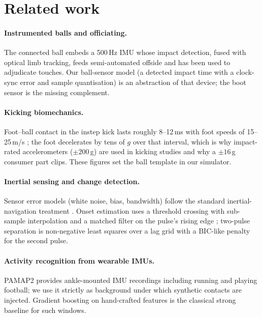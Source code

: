 \section{Related work}
\label{sec:related}

\paragraph{Instrumented balls and officiating.} The connected ball
\cite{fifa2022connected} embeds a 500\,Hz IMU whose impact detection, fused
with optical limb tracking, feeds semi-automated offside and has been used to
adjudicate touches. Our ball-sensor model (a detected impact time with a
clock-sync error and sample quantisation) is an abstraction of that device; the
boot sensor is the missing complement.

\paragraph{Kicking biomechanics.} Foot--ball contact in the instep kick lasts
roughly 8--12\,ms with foot speeds of 15--25\,m/s \cite{nunome2006impact,
lees1998biomechanics}; the foot decelerates by tens of $g$ over that interval,
which is why impact-rated accelerometers ($\pm 200$\,g) are used in kicking
studies and why a $\pm16$\,g consumer part clips. These figures set the ball
template in our simulator.

\paragraph{Inertial sensing and change detection.} Sensor error models (white
noise, bias, bandwidth) follow the standard inertial-navigation treatment
\cite{woodman2007introduction}. Onset estimation uses a threshold crossing
with sub-sample interpolation and a matched filter on the pulse's rising edge
\cite{turin1960introduction}; two-pulse separation is non-negative least
squares \cite{lawson1974solving} over a lag grid with a BIC-like penalty for
the second pulse.

\paragraph{Activity recognition from wearable IMUs.} PAMAP2
\cite{reiss2012introducing} provides ankle-mounted IMU recordings including
running and playing football; we use it strictly as background under which
synthetic contacts are injected. Gradient boosting \cite{friedman2001greedy}
on hand-crafted features is the classical strong baseline for such windows.

